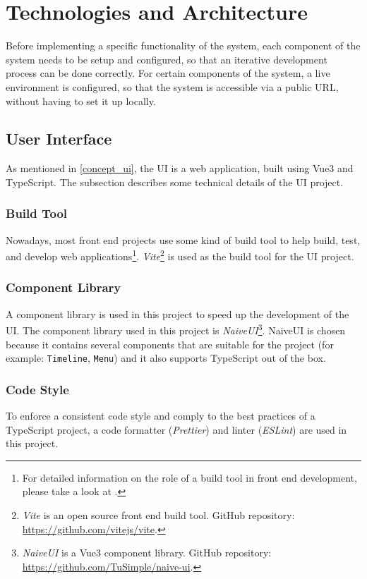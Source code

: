 \section{Technologies and Architecture}

Before implementing a specific functionality of the system, each component of the system needs to be setup and configured, so that an iterative development process can be done correctly. For certain components of the system, a live environment is configured, so that the system is accessible via a public URL, without having to set it up locally. 

 \subsection{User Interface}

    As mentioned in \autoref{concept_ui}, the UI is a web application, built using Vue3 and TypeScript. The subsection describes some technical details of the UI project. 

  \subsubsection{Build Tool}
   Nowadays, most front end projects use some kind of build tool to help build, test, and develop web applications\footnote{For detailed information on the role of a build tool in front end development, please take a look at \autocite{Odell2014}.}. \emph{Vite}\footnote{\emph{Vite} is an open source front end build tool. GitHub repository: \url{https://github.com/vitejs/vite}.} is used as the build tool for the UI project.

  \subsubsection{Component Library}
  A component library is used in this project to speed up the development of the UI. The component library used in this project is \emph{NaiveUI}\footnote{\emph{NaiveUI} is a Vue3 component library. GitHub repository: \url{https://github.com/TuSimple/naive-ui}.}. NaiveUI is chosen because it contains several components that are suitable for the project (for example: \verb;Timeline;, \verb;Menu;) and it also supports TypeScript out of the box.

  \subsubsection{Code Style}
  To enforce a consistent code style and comply to the best practices of a TypeScript project, a code formatter (\emph{Prettier}) and linter (\emph{ESLint}) are used in this project. 

